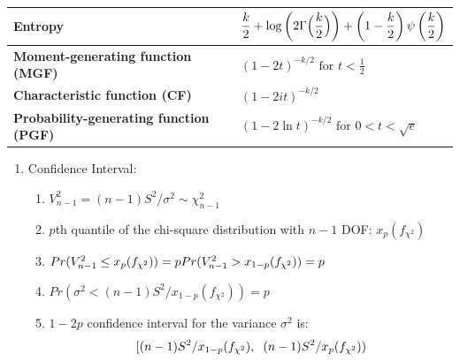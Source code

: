 \begin{longtable}{|m{6cm}|p{9cm}|}
    \textbf{Entropy} &
    ${\displaystyle {{\dfrac {k}{2}} +\log \left(2\Gamma {\Bigl (}{\dfrac {k}{2}}{\Bigr )}\right)+\left(1-{\dfrac {k}{2}}\right)\psi \left({\dfrac {k}{2}}\right)}}$
    \\[1ex] \hline

    \textbf{Moment-generating function (MGF)} &
    ${\displaystyle (1-2t)^{-k/2}{\text{ for }}t<{\frac {1}{2}}\;}$
    \\[1ex] \hline

    \textbf{Characteristic function (CF)} &
    ${\displaystyle (1-2it)^{-k/2}}$
    \\[1ex] \hline

    \textbf{Probability-generating function (PGF)} &
    ${\displaystyle (1-2\ln t)^{-k/2}{\text{ for }}0<t<{\sqrt {e}}\;}$
    \\[1ex] \hline

\end{longtable}
\renewcommand{\arraystretch}{1}

\begin{enumerate}[itemsep=0.2cm]
    \item Confidence Interval:
    \begin{enumerate}[itemsep=0.2cm]
        \item $V_{n-1}^2 = (n-1)S^2/\sigma^2 \sim \chi_{n-1}^2$

        \item $p$th quantile of the chi-square distribution with $n - 1$ DOF: $x_p(f_{\chi^2})$

        \item $
            \hfill
            Pr(V_{n-1}^2 \leq x_p(f_{\chi^2})) = p
            \hfill
            Pr(V_{n-1}^2 > x_{1-p}(f_{\chi^2})) = p
            \hfill
        $

        \item $
            Pr(\sigma^2 < (n-1)S^2/x_{1-p}(f_{\chi^2})) = p 
        $

        \item $1 - 2p$ confidence interval for the variance $\sigma^2$ is:
        \[[
            (n-1)S^2/x_{1-p}(f_{\chi^2}), 
            \hspace{0.2cm}
            (n-1)S^2/x_{p}(f_{\chi^2})
        )\]

    \end{enumerate}

\end{enumerate}
































